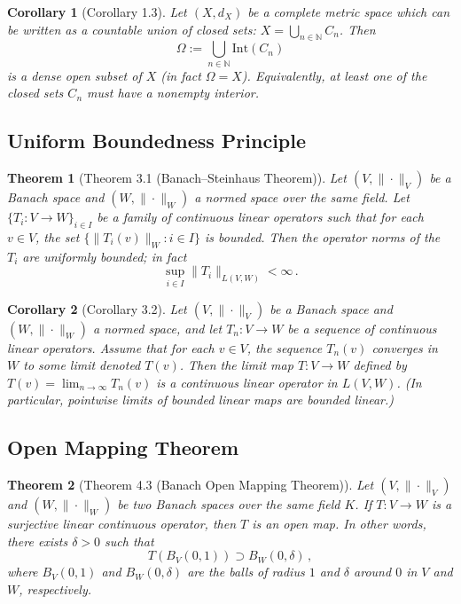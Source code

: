 \documentclass{article}
\theoremstyle{plain}
\newtheorem*{theorem*}{Theorem}
\newtheorem*{corollary*}{Corollary}
\begin{document}
\begin{corollary*}[Corollary 1.3]
Let $(X,d_X)$ be a complete metric space which can be written as a countable union of closed sets: $X = \bigcup_{n\in\mathbb{N}} C_n$. Then 
\[ 
\Omega := \bigcup_{n\in\mathbb{N}} \mathrm{Int}(C_n)
\] 
is a dense open subset of $X$ (in fact $\Omega = X$). Equivalently, at least one of the closed sets $C_n$ must have a nonempty interior.
\end{corollary*}

\subsection*{Uniform Boundedness Principle}
\begin{theorem*}[Theorem 3.1 (Banach–Steinhaus Theorem)]
Let $(V,\|\cdot\|_V)$ be a Banach space and $(W,\|\cdot\|_W)$ a normed space over the same field. Let $\{T_i: V \to W\}_{i\in I}$ be a family of continuous linear operators such that for each $v \in V$, the set $\{\|T_i(v)\|_W: i \in I\}$ is bounded. Then the operator norms of the $T_i$ are uniformly bounded; in fact 
\[ 
\sup_{i\in I} \|T_i\|_{L(V,W)} < \infty\,.
\]
\end{theorem*}

\begin{corollary*}[Corollary 3.2]
Let $(V,\|\cdot\|_V)$ be a Banach space and $(W,\|\cdot\|_W)$ a normed space, and let $T_n: V \to W$ be a sequence of continuous linear operators. Assume that for each $v\in V$, the sequence $T_n(v)$ converges in $W$ to some limit denoted $T(v)$. Then the limit map $T: V \to W$ defined by $T(v) = \lim_{n\to\infty} T_n(v)$ is a continuous linear operator in $L(V,W)$. (In particular, pointwise limits of bounded linear maps are bounded linear.)
\end{corollary*}

\subsection*{Open Mapping Theorem}
\begin{theorem*}[Theorem 4.3 (Banach Open Mapping Theorem)]
Let $(V,\|\cdot\|_V)$ and $(W,\|\cdot\|_W)$ be two Banach spaces over the same field $K$. If $T: V \to W$ is a surjective linear continuous operator, then $T$ is an open map.  In other words, there exists $\delta > 0$ such that 
\[ 
T(B_V(0,1)) \supset B_W(0,\delta)\,,
\] 
where $B_V(0,1)$ and $B_W(0,\delta)$ are the balls of radius $1$ and $\delta$ around $0$ in $V$ and $W$, respectively.
\end{theorem*}
\end{document}
